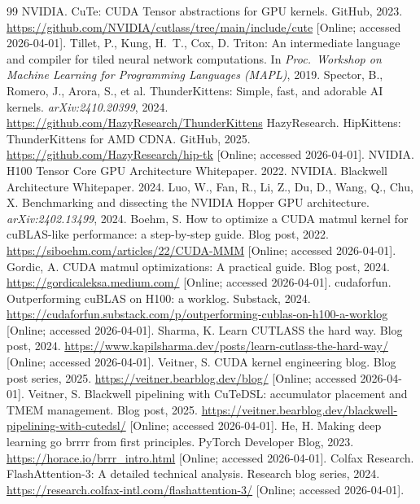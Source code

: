 \documentclass[10pt]{article}
\begin{document}
\begin{thebibliography}{99}
 NVIDIA. CuTe: CUDA Tensor abstractions for GPU kernels. GitHub, 2023. \url{https://github.com/NVIDIA/cutlass/tree/main/include/cute} [Online; accessed 2026-04-01].
 Tillet, P., Kung, H.~T., Cox, D. Triton: An intermediate language and compiler for tiled neural network computations. In \emph{Proc.\ Workshop on Machine Learning for Programming Languages (MAPL)}, 2019.
 Spector, B., Romero, J., Arora, S., et al. ThunderKittens: Simple, fast, and adorable AI kernels. \emph{arXiv:2410.20399}, 2024. \url{https://github.com/HazyResearch/ThunderKittens}
 HazyResearch. HipKittens: ThunderKittens for AMD CDNA. GitHub, 2025. \url{https://github.com/HazyResearch/hip-tk} [Online; accessed 2026-04-01].
 NVIDIA. H100 Tensor Core GPU Architecture Whitepaper. 2022.
 NVIDIA. Blackwell Architecture Whitepaper. 2024.
 Luo, W., Fan, R., Li, Z., Du, D., Wang, Q., Chu, X. Benchmarking and dissecting the NVIDIA Hopper GPU architecture. \emph{arXiv:2402.13499}, 2024.
 Boehm, S. How to optimize a CUDA matmul kernel for cuBLAS-like performance: a step-by-step guide. Blog post, 2022. \url{https://siboehm.com/articles/22/CUDA-MMM} [Online; accessed 2026-04-01].
 Gordic, A. CUDA matmul optimizations: A practical guide. Blog post, 2024. \url{https://gordicaleksa.medium.com/} [Online; accessed 2026-04-01].
 cudaforfun. Outperforming cuBLAS on H100: a worklog. Substack, 2024. \url{https://cudaforfun.substack.com/p/outperforming-cublas-on-h100-a-worklog} [Online; accessed 2026-04-01].
 Sharma, K. Learn CUTLASS the hard way. Blog post, 2024. \url{https://www.kapilsharma.dev/posts/learn-cutlass-the-hard-way/} [Online; accessed 2026-04-01].
 Veitner, S. CUDA kernel engineering blog. Blog post series, 2025. \url{https://veitner.bearblog.dev/blog/} [Online; accessed 2026-04-01].
 Veitner, S. Blackwell pipelining with CuTeDSL: accumulator placement and TMEM management. Blog post, 2025. \url{https://veitner.bearblog.dev/blackwell-pipelining-with-cutedsl/} [Online; accessed 2026-04-01].
 He, H. Making deep learning go brrrr from first principles. PyTorch Developer Blog, 2023. \url{https://horace.io/brrr_intro.html} [Online; accessed 2026-04-01].
 Colfax Research. FlashAttention-3: A detailed technical analysis. Research blog series, 2024. \url{https://research.colfax-intl.com/flashattention-3/} [Online; accessed 2026-04-01].

\end{thebibliography}
\end{document}
